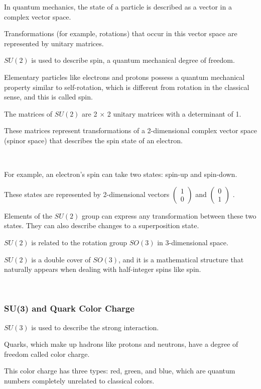 \documentclass[uplatex,a4j,12pt,dvipdfmx]{jsarticle}
\begin{document}
In quantum mechanics, the state of a particle is described as a vector in a complex vector space.

Transformations (for example, rotations) that occur in this vector space are represented by unitary matrices.

$SU(2)$ is used to describe spin, a quantum mechanical degree of freedom.

Elementary particles like electrons and protons possess a quantum mechanical property similar to self-rotation, which is different from rotation in the classical sense, and this is called spin.

The matrices of $SU(2)$ are 2 $\times$ 2 unitary matrices with a determinant of 1.

These matrices represent transformations of a 2-dimensional complex vector space (spinor space) that describes the spin state of an electron.

\ \ 

For example, an electron's spin can take two states: spin-up and spin-down.

These states are represented by 2-dimensional vectors
$
	\begin{pmatrix} 1 \\
		0\end{pmatrix}
$
and
$
	\begin{pmatrix} 0 \\
		1\end{pmatrix}
$
.

Elements of the $SU(2)$ group can express any transformation between these two states.
They can also describe changes to a superposition state.

$SU(2)$ is related to the rotation group $SO(3)$ in 3-dimensional space.

$SU(2)$ is a double cover of $SO(3)$, and it is a mathematical structure that naturally appears when dealing with half-integer spins like spin.

\ \ 

\subsubsection{\textbf{SU(3) and Quark Color Charge}}

$SU(3)$ is used to describe the strong interaction.

Quarks, which make up hadrons like protons and neutrons, have a degree of freedom called color charge.

This color charge has three types: red, green, and blue, which are quantum numbers completely unrelated to classical colors.
\end{document}
